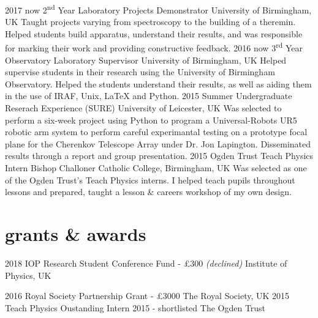 \documentclass[]{k-cv} %
\begin{document}
\begin{entrylist}
\entry
{2017 \to now}
{2\textsuperscript{nd} Year Laboratory Projects Demonstrator}
{University of Birmingham, UK}
{Taught projects varying from spectroscopy to the building of a theremin. Helped students build apparatus, understand their results, and was responsible for marking their work and providing constructive feedback.}
\entry
{2016 \to now}
{3\textsuperscript{rd} Year Observatory Laboratory Supervisor}
{University of Birmingham, UK}
{Helped supervise students in their research using the University of Birmingham Observatory. Helped the students understand their results, as well as aiding them in the use of IRAF, Unix, LaTeX and Python.}
\entry
{2015}
{Summer Undergraduate Reserach Experience (SURE)}
{University of Leicester, UK}
{Was selected to perform a six-week project using Python to program a
Universal-Robots UR5 robotic arm system to perform careful experimantal testing
on a prototype focal plane for the Cherenkov Telescope Array under Dr. Jon
Lapington. Disseminated results through a report and group presentation.}
\entry
{2015}
{Ogden Trust Teach Physics Intern}
{Bishop Challoner Catholic College, Birmingham, UK}
{Was selected as one of the Ogden Trust's Teach Physics interns. I helped teach
pupils throughout lessons and prepared, taught a lesson \& careers workshop of my own
design.}
\end{entrylist}

\clearpage
{}
\section{grants \& awards}

\begin{entrylist}
\entrythree
{2018}
{IOP Research Student Conference Fund - \pounds 300 \emph{(declined)}}
{Institute of Physics, UK}

\entrythree
{2016}
{Royal Society Partnership Grant - \pounds 3000}
{The Royal Society, UK}
\entrythree
{2015}
{Teach Physics Oustanding Intern 2015 - shortlisted}
{The Ogden Trust}

\end{entrylist}
\end{document}
